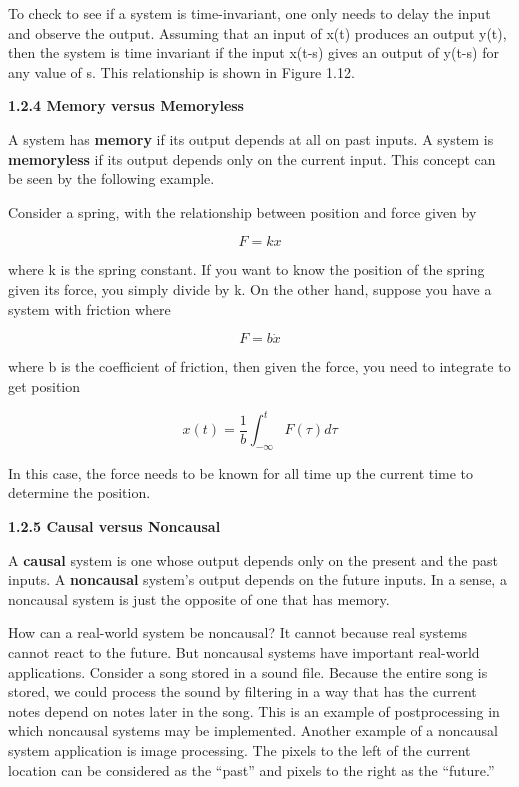 \documentclass[12pt]{article}
\begin{document}
To check to see if a system is time-invariant, one only needs to delay the
input and observe the output. Assuming that an input of x(t) produces an
output y(t), then the system is time invariant if the input x(t-s) gives an
output of y(t-s) for any value of s. This relationship is shown in Figure 1.12.

\hfill

\textbf{1.2.4 Memory versus Memoryless}

\hfill

A system has \textbf{memory} if its output depends at all on past inputs. A system is
\textbf{memoryless} if its output depends only on the current input. This concept
can be seen by the following example.

Consider a spring, with the relationship between position and force
given by

\[
F = k x
\]

where k is the spring constant. If you want to know the position of the
spring given its force, you simply divide by k. On the other hand, suppose
you have a system with friction where

\[
F = b \dot{x} 
\]

where b is the coefficient of friction, then given the force, you need to integrate
to get position

\[
x(t) = \frac{1}{b} \int_{- \infty}^{t} F(\tau) d \tau
\]

In this case, the force needs to be known for all time up the current time
to determine the position.

\hfill

\textbf{1.2.5 Causal versus Noncausal}

\hfill

A \textbf{causal} system is one whose output depends only on the present and the
past inputs. A \textbf{noncausal} system’s output depends on the future inputs. In a
sense, a noncausal system is just the opposite of one that has memory.

How can a real-world system be noncausal? It cannot because real
systems cannot react to the future. But noncausal systems have important
real-world applications. Consider a song stored in a sound file. Because the
entire song is stored, we could process the sound by filtering in a way that
has the current notes depend on notes later in the song. This is an example
of postprocessing in which noncausal systems may be implemented.
Another example of a noncausal system application is image processing.
The pixels to the left of the current location can be considered as the “past”
and pixels to the right as the “future.”
\end{document}
